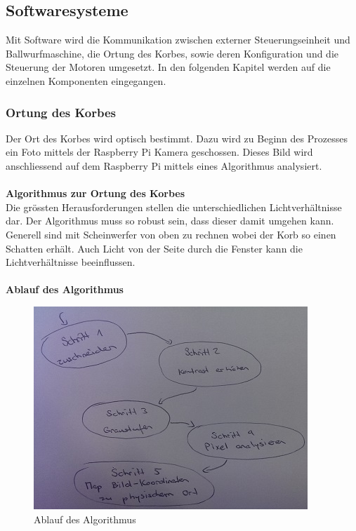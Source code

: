\subsection{Softwaresysteme}
Mit Software wird die Kommunikation zwischen externer Steuerungseinheit und Ballwurfmaschine, die Ortung des Korbes, sowie deren Konfiguration und die Steuerung der Motoren umgesetzt. In den folgenden Kapitel werden auf die einzelnen Komponenten eingegangen.

\subsubsection{Ortung des Korbes}
Der Ort des Korbes wird optisch bestimmt. Dazu wird zu Beginn des Prozesses ein Foto mittels der Raspberry Pi Kamera geschossen. Dieses Bild wird anschliessend auf dem Raspberry Pi mittels eines Algorithmus analysiert.\\
\\
\textbf{Algorithmus zur Ortung des Korbes}\\
\label{abb-algorithmus-zur-ortung-des-korbes}
Die grössten Herausforderungen stellen die unterschiedlichen Lichtverhältnisse dar. Der Algorithmus muss so robust sein, dass dieser damit umgehen kann. Generell sind mit Scheinwerfer von oben zu rechnen wobei der Korb so einen Schatten erhält. Auch Licht von der Seite durch die Fenster kann die Lichtverhältnisse beeinflussen.\\
\\
\textbf{Ablauf des Algorithmus}\\
\begin{figure}[h!]
	\centering
	\includegraphics[scale=0.75]{../../fig/ablauf-algorithmus-orts-erkennung.jpg}
	\caption{Ablauf des Algorithmus}
\end{figure}

